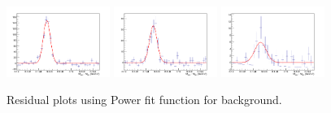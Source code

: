 \begin{figure}[!h]
\begin{center}
\includegraphics[width=0.3\textwidth]{figures/Dstar/pp13TeV/multi_trial/residual_plot_Pow_bkg_func_16-24GeV.png} 
\includegraphics[width=0.3\textwidth]{figures/Dstar/pp13TeV/multi_trial/residual_plot_Pow_bkg_func_24-36GeV.png}
\includegraphics[width=0.3\textwidth]{figures/Dstar/pp13TeV/multi_trial/residual_plot_Pow_bkg_func_36-50GeV.png} 

\caption{Residual plots using Power fit function for background.}
\label{fig:DstarYield_residual_power}
\end{center}
\end{figure}







